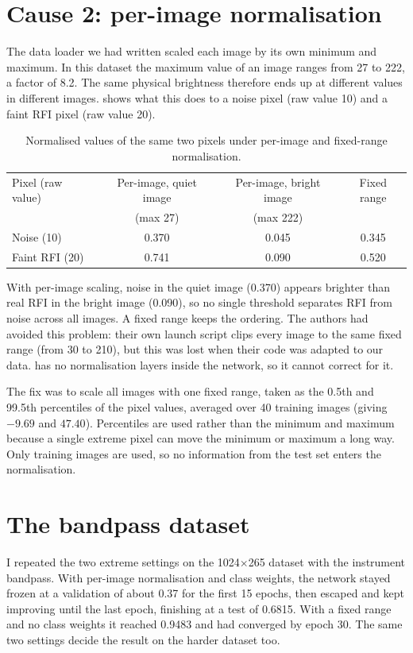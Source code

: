 \section{Cause 2: per-image normalisation}
\label{sec:pernorm}
The data loader we had written scaled each image by its own minimum and
maximum. In this dataset the maximum value of an image ranges from 27 to 222,
a factor of 8.2. The same physical brightness therefore ends up at different
values in different images.  shows what this does to a noise
pixel (raw value 10) and a faint RFI pixel (raw value 20).

\begin{table}[H]
  \centering
  \caption{Normalised values of the same two pixels under per-image and
    fixed-range normalisation.}
  \label{tab:pernorm}
  \begin{tabular}{lccc}
    \toprule
    Pixel (raw value) & Per-image, quiet image & Per-image, bright image & Fixed range \\
     & (max 27) & (max 222) & \\
    \midrule
    Noise (10)     & 0.370 & 0.045 & 0.345 \\
    Faint RFI (20) & 0.741 & 0.090 & 0.520 \\
    \bottomrule
  \end{tabular}
\end{table}

With per-image scaling, noise in the quiet image (0.370) appears brighter than
real RFI in the bright image (0.090), so no single threshold separates RFI from
noise across all images. A fixed range keeps the ordering. The authors had
avoided this problem: their own launch script clips every image to the same
fixed range (from 30 to 210), but this was lost when their code was adapted to
our data. \tfunet{} has no normalisation layers inside the network, so it
cannot correct for it.

The fix was to scale all images with one fixed range, taken as the 0.5th and
99.5th percentiles of the pixel values, averaged over 40 training images
(giving $-9.69$ and $47.40$). Percentiles are used rather than the minimum and
maximum because a single extreme pixel can move the minimum or maximum a long
way. Only training images are used, so no information from the test set
enters the normalisation.

\section{The bandpass dataset}
\label{sec:tfunet_v4}
I repeated the two extreme settings on the 1024$\times$265 dataset with the
instrument bandpass. With per-image normalisation and class weights, the
network stayed frozen at a validation \Fone{} of about 0.37 for the first 15
epochs, then escaped and kept improving until the last epoch, finishing at a
test \Fone{} of 0.6815. With a fixed range and no class weights it reached
0.9483 and had converged by epoch 30. The same two settings decide the result
on the harder dataset too.

